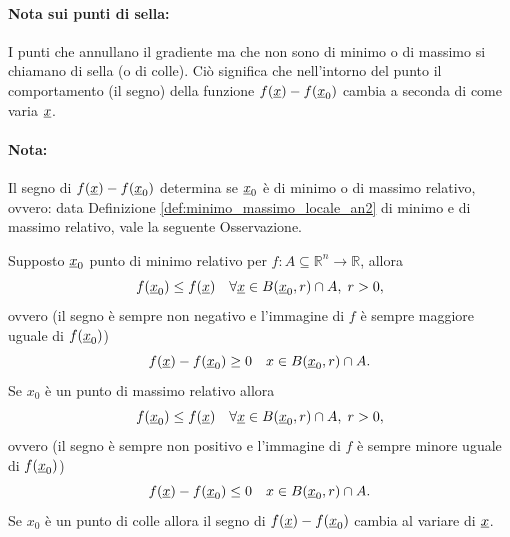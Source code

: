 \paragraph{Nota sui punti di sella:} I punti che annullano il gradiente ma che non sono di minimo o di massimo si chiamano di sella (o di colle). Ciò significa che nell'intorno del punto il comportamento (il segno) della funzione $f(\uline x) - f(\uline x_0)$ cambia a seconda di come varia $\uline x$. 

\paragraph{Nota:} Il segno di $f(\uline x) - f(\uline x_0)$ determina se $\uline x_0$ è di minimo o di massimo relativo, ovvero: data Definizione \ref{def:minimo_massimo_locale_an2} di minimo e di massimo relativo, vale la seguente Osservazione.

\begin{remark}\label{rem:min_max_non_ufficiale}
	Supposto $\uline x_0$ punto di minimo relativo per $f:A\subseteq\mathbb{R}^n\rightarrow\mathbb{R}$, allora
	\begin{equation*}
		f(\uline x_0)\leq f(\uline x)\quad \forall\uline x\in B(\uline x_0,r)\cap A,\; r>0,
	\end{equation*}
	ovvero (il segno è sempre non negativo e l'immagine di $f$ è sempre maggiore uguale di $f(\uline x_0)$)
	\begin{equation}\label{eq:differenza_punto_sella}
		f(\uline x) - f(\uline x_0) \geq 0\quad x\in B(\uline x_0,r)\cap A.
	\end{equation}
	Se $x_0$ è un punto di massimo relativo allora
	\begin{equation*}
		f(\uline x_0)\leq f(\uline x)\quad \forall\uline x\in B(\uline x_0,r)\cap A,\; r>0,
	\end{equation*}
	ovvero (il segno è sempre non positivo e l'immagine di $f$ è sempre minore uguale di $f(\uline x_0)$)
	\begin{equation*}
		f(\uline x) - f(\uline x_0) \leq 0\quad x\in B(\uline x_0,r)\cap A.
	\end{equation*}
	Se $x_0$ è un punto di colle allora il segno di $f(\uline x) - f(\uline x_0)$ cambia al variare di $\uline x$.
\end{remark}

